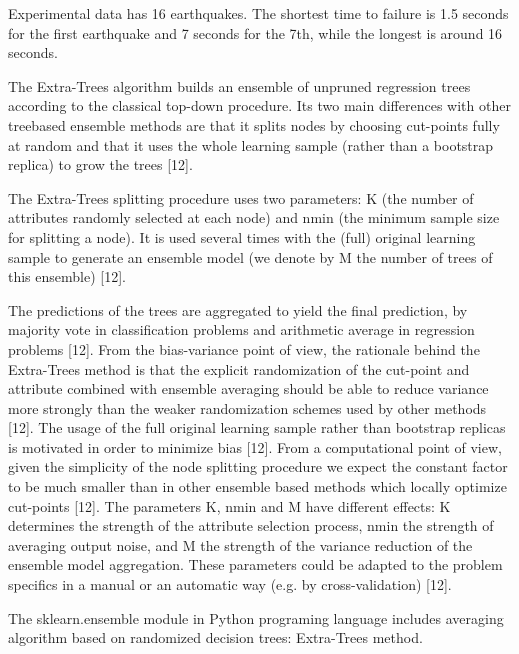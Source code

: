 \documentclass[]{llncs} %
\begin{document}
Experimental data has 16 earthquakes. The shortest time to failure is 1.5 seconds for the first earthquake and 7 seconds for the 7th, while the longest is around 16 seconds. \par

The Extra-Trees algorithm builds an ensemble of unpruned regression trees according to the classical top-down procedure. Its two main differences with other treebased ensemble methods are that it splits nodes by choosing cut-points fully at random and that it uses the whole learning sample (rather than a bootstrap replica) to grow the trees [12]. \par

The Extra-Trees splitting procedure uses two parameters: K (the number of attributes randomly selected at each node) and nmin (the minimum sample size for splitting a node). It is used several times with the (full) original learning sample to generate an ensemble model (we denote by M the number of trees of this ensemble) [12]. 

The predictions of the trees are aggregated to yield the final prediction, by majority vote in classification problems and arithmetic average in regression problems [12]. From the bias-variance point of view, the rationale behind the Extra-Trees method is that the explicit randomization of the cut-point and attribute combined with ensemble averaging should be able to reduce variance more strongly than the weaker randomization schemes used by other methods [12]. The usage of the full original learning sample rather than bootstrap replicas is motivated in order to minimize bias [12]. From a computational point of view, given the simplicity of the node splitting procedure we expect the constant factor to be much smaller than in other ensemble based methods which locally optimize cut-points [12]. The parameters K, nmin and M have different effects: K determines the strength of the attribute selection process, nmin the strength of averaging output noise, and M the strength of the variance reduction of the ensemble model aggregation. These parameters could be adapted to the problem specifics in a manual or an automatic way (e.g. by cross-validation) [12]. \par

The sklearn.ensemble module in Python programing language includes averaging algorithm based on randomized decision trees: Extra-Trees method. \par
\end{document}
